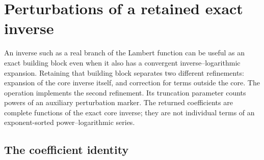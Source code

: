 \section{Perturbations of a retained exact inverse}
\label{sec:core-perturbations}

An inverse such as a real branch of the Lambert function can be useful as an exact building block even when it also has a convergent inverse--logarithmic expansion. Retaining that building block separates two different refinements: expansion of the core inverse itself, and correction for terms outside the core. The operation  implements the second refinement. Its truncation parameter counts powers of an auxiliary perturbation marker. The returned coefficients are complete functions of the exact core inverse; they are not individual terms of an exponent-sorted power--logarithmic series.

\subsection{The coefficient identity}

